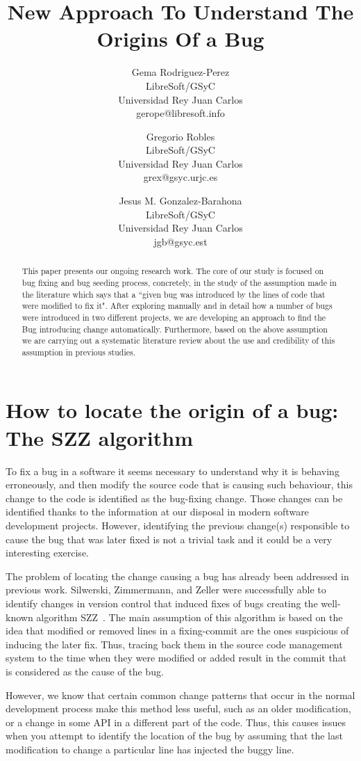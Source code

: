 \documentclass[a4paper]{article}
\title{New Approach To Understand The Origins Of a Bug }
\author{
Gema Rodriguez-Perez \\ LibreSoft/GSyC\\
                Universidad Rey Juan Carlos \\ gerope@libresoft.info
\and
Gregorio Robles \\ LibreSoft/GSyC\\
                Universidad Rey Juan Carlos \\ grex@gsyc.urjc.es
\and
Jesus M. Gonzalez-Barahona \\LibreSoft/GSyC\\
                Universidad Rey Juan Carlos \\ jgb@gsyc.est
}
\begin{document}
\maketitle

\begin{abstract}

This paper presents our ongoing research work. The core of our study is focused on bug fixing and bug seeding process, concretely, in the study of the assumption made in the literature which says that a ``given bug was introduced by the lines of code that were modified to fix it". After exploring manually and in detail how a number of bugs were introduced in two different projects, we are developing an approach to find the Bug introducing change automatically. Furthermore, based on the above assumption we are carrying out a systematic literature review about the use and credibility of this assumption in previous studies.

\end{abstract}


\section{How to locate the origin of a bug: The SZZ algorithm}

To fix a bug in a software it seems necessary to understand why it is behaving erroneously, and then modify the source code that is causing such behaviour, this change to the code is identified as the bug-fixing change. Those changes can be identified thanks to the information at our disposal in modern software development projects. However, identifying the previous change(s) responsible to cause the bug that was later fixed is not a trivial task and it could be a very interesting exercise.

The problem of locating the change causing a bug has already been addressed in previous work. Silwerski, Zimmermann, and Zeller were successfully able to identify changes in version control that induced fixes of bugs creating the well-known algorithm SZZ~\cite{sliwerski2005changes}. The main assumption of this algorithm is based on the idea that modified or removed lines in a fixing-commit are the ones suspicious of inducing the later fix. Thus, tracing back them in the source code management system to the time when they were modified or added result in the commit that is considered as the cause of the bug.

However, we know that certain common change patterns that occur in the normal development process make this method less useful, such as an older modification, or a change in some API in a different part of the code. Thus, this causes issues when you attempt to identify the location of the bug by assuming that the last modification to change a particular line has injected the buggy line.
\end{document}
